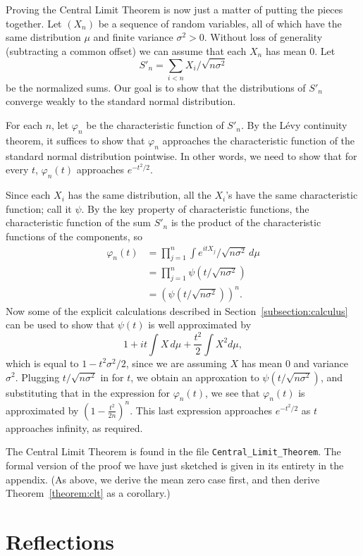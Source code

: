 \documentclass{svjour3}
\newcommand{\ph}{\varphi}
\begin{document}
Proving the Central Limit Theorem is now just a matter of putting the pieces together. Let $(X_n)$ be a sequence of random variables, all of which have the same distribution $\mu$ and finite variance $\sigma^2 > 0$. Without loss of generality (subtracting a common offset) we can assume that each $X_n$ has mean $0$. Let
\[
 S'_n = \sum_{i < n} X_i / \sqrt {n \sigma^2}
\]
be the normalized sums. Our goal is to show that the distributions of $S'_n$ converge weakly to the standard normal distribution.

For each $n$, let $\ph_n$ be the characteristic function of $S'_n$. By the L\'evy continuity theorem, it suffices to show that $\ph_n$ approaches the characteristic function of the standard normal distribution pointwise. In other words, we need to show that for every $t$, $\ph_n(t)$ approaches $e^{-t^2/2}$.

Since each $X_i$ has the same distribution, all the $X_i$'s have the same characteristic function; call it $\psi$. By the key property of characteristic functions, the characteristic function of the sum $S'_n$ is the product of the characteristic functions of the components, so
\begin{align*}
 \ph_n(t) & = \prod_{j = 1}^n \int e^{itX_j} / \sqrt{n \sigma^2} \, d\mu \\
   & = \prod_{j = 1}^n \psi(t / \sqrt{n \sigma^2}) \\
   & = (\psi(t / \sqrt{n \sigma^2}))^n.
\end{align*}
Now some of the explicit calculations described in Section~\ref{subsection:calculus} can be used to show that $\psi(t)$ is well approximated by
\[
1 + it \int X \, d\mu + \frac{t^2}{2} \int X^2 d\mu,
\]
which is equal to $1 - t^2\sigma^2 / 2$, since we are assuming $X$ has mean $0$ and variance $\sigma^2$. Plugging $t / \sqrt{n \sigma^2}$ in for $t$, we obtain an approxation to $\psi(t / \sqrt{n \sigma^2})$, and substituting that in the expression for $\ph_n(t)$, we see that $\ph_n(t)$ is approximated by $(1 - \frac{t^2}{2n})^n$. This last expression approaches $e^{-t^2/2}$ as $t$ approaches infinity, as required.

The Central Limit Theorem is found in the file \texttt{Central\_Limit\_Theorem}. The formal version of the proof we have just sketched is given in its entirety in the appendix. (As above, we derive the mean zero case first, and then derive Theorem~\ref{theorem:clt} as a corollary.)

\section{Reflections}
\label{section:reflections}
\end{document}
